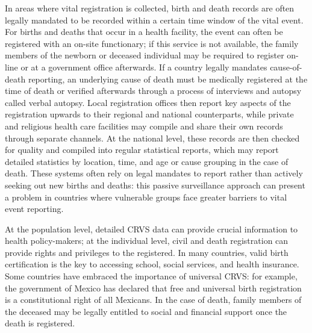 \documentclass[
]{report}
\begin{document}
In areas where vital registration is collected, birth and death records are often legally mandated to be recorded within a certain time window of the vital event. For births and deaths that occur in a health facility, the event can often be registered with an on-site functionary; if this service is not available, the family members of the newborn or deceased individual may be required to register on-line or at a government office afterwards. If a country legally mandates cause-of-death reporting, an underlying cause of death must be medically registered at the time of death or verified afterwards through a process of interviews and autopsy called verbal autopsy.\autocite{Mikkelsen2010} Local registration offices then report key aspects of the registration upwards to their regional and national counterparts, while private and religious health care facilities may compile and share their own records through separate channels. At the national level, these records are then checked for quality and compiled into regular statistical reports, which may report detailed statistics by location, time, and age or cause grouping in the case of death.\autocite{Setel2007,UnitedNationsStatisticsDivision2014} These systems often rely on legal mandates to report rather than actively seeking out new births and deaths: this passive surveillance approach can present a problem in countries where vulnerable groups face greater barriers to vital event reporting.\autocite{Fisker2019,Hernandez2012}

At the population level, detailed CRVS data can provide crucial information to health policy-makers; at the individual level, civil and death registration can provide rights and privileges to the registered. In many countries, valid birth certification is the key to accessing school, social services, and health insurance. Some countries have embraced the importance of universal CRVS: for example, the government of Mexico has declared that free and universal birth registration is a constitutional right of all Mexicans. In the case of death, family members of the deceased may be legally entitled to social and financial support once the death is registered.\autocite{Setel2007}
\end{document}
